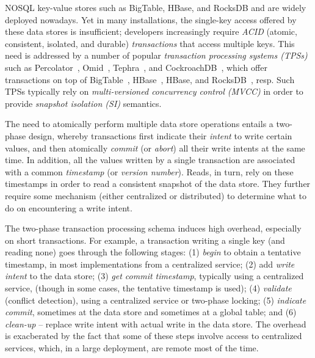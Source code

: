 
NOSQL key-value stores such as BigTable, HBase, and RocksDB 
and are widely deployed nowadays. 
Yet in many installations, the single-key access offered by these data stores is insufficient; developers  increasingly require 
 \emph{ACID} (atomic, consistent, isolated, and durable) \emph{transactions} that access multiple keys.
This need is addressed by a number of popular  \emph{transaction processing systems (TPSs)} 
such as  Percolator~\cite{Percolator2010}, Omid~\cite{OmidICDE2014,omid-fast}, Tephra~\cite{tephra}, and CockroachDB~\cite{cockroach}, 
which offer transactions on top of  BigTable~\cite{bigtable-osdi06}, HBase~\cite{hbase}, HBase, and RocksDB~\cite{rocksdb}, resp. 
Such TPSs typically rely on \emph{multi-versioned concurrency control (MVCC)} in order to provide 
\emph{snapshot isolation (SI)} semantics.


The need to atomically perform multiple  data store operations entails a two-phase design, whereby transactions first indicate their \emph{intent} to write certain values, and then atomically \emph{commit} (or \emph{abort}) all their write intents at the same time. In addition, 
all the values written by a single transaction are associated with a common  \emph{timestamp} (or \emph{version number}). 
Reads, in turn, rely on these timestamps in order to read a consistent snapshot of the data store. They further  
require some mechanism (either centralized or distributed) to determine what to do on encountering a write intent.

The two-phase transaction processing schema induces high overhead, especially on short transactions. 
For example, a transaction writing a single key (and reading none) goes through the following stages:  
(1) \emph{begin} to obtain a tentative timestamp, in most implementations from a centralized service;  
(2) add \emph{write intent} to the data store; 
(3) \emph{get commit timestamp}, typically using a centralized service, (though in some cases, the tentative timestamp is used);
(4) \emph{validate} (conflict detection), using a centralized service or two-phase locking; 
(5) \emph{indicate commit}, sometimes at the data store and sometimes at a global table; and 
(6) \emph{clean-up} -- replace write intent with actual write in the data store. 
The overhead is exacberated by 
the fact that some of these steps involve access to centralized services, which, in a large deployment, are remote most of the time.

